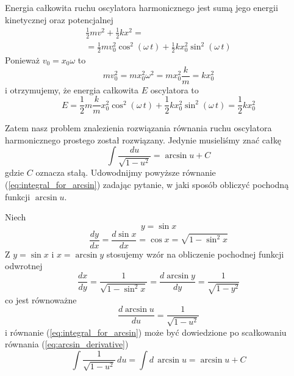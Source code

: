 \documentclass[12pt,a4paper,pl,fleqn]{article}
\begin{document}
Energia całkowita ruchu oscylatora harmonicznego jest sumą jego e\-ner\-gii kinetycznej oraz potencjalnej
\begin{eqnarray}
    \frac{1}{2} m v^{2} + \frac{1}{2} k x^{2} =                     \\ \nonumber
  = \frac{1}{2} m v_{0}^{2} \cos^{2}(\omega \, t) +
    \frac{1}{2} k x_{0}^{2} \sin^{2}(\omega \, t)
\end{eqnarray}
Ponieważ $v_{0} = x_{0} \omega$ to 
\begin{equation}
m v_{0}^{2} = m x_{0}^{2} \omega^{2} = m x_{0}^{2} \frac{k}{m} = k x_{0}^{2}
\end{equation}
i otrzymujemy, że energia całkowita $E$ oscylatora to
\begin{equation}
E = \frac{1}{2} m \frac{k}{m} x_{0}^{2} \cos^{2}(\omega \, t) + \frac{1}{2} k x_{0}^{2} \sin^{2}(\omega \, t)
=
\frac{1}{2} k x_{0}^{2}
\end{equation}

Zatem nasz problem znalezienia rozwiązania równania ruchu os\-cy\-la\-to\-ra
harmonicznego prostego został rozwiązany. Jedynie musieliśmy znać całkę
\begin{equation}
\label{eq:integral_for_arcsin}
    \int \frac{d u}{ \sqrt{ 1 - u^{2}} } = \arcsin u + C
\end{equation}
gdzie $C$ oznacza stałą. Udowodnijmy powyższe równanie (\ref{eq:integral_for_arcsin}) zadając pytanie,
w jaki sposób obliczyć pochodną funkcji $\arcsin u$\@.

Niech
\begin{equation}
                y = \sin x
\end{equation}
\begin{equation}
                \frac{d y}{d x} = \frac{d \sin x}{d x} = \cos x = \sqrt{1 - \sin^2 x}
\end{equation}
Z 
$y = \sin x$  i   $x = \arcsin y$ stosujemy wzór na obliczenie pochodnej funkcji odwrotnej
\begin{equation}
                \frac{d x}{d y} =  \frac{1}{\sqrt{1 - \sin^2 x}} = \frac{d \arcsin y}{d y}    =   \frac{1}{\sqrt{1 - y^2}}
\end{equation}
co jest równoważne
\begin{equation}
\label{eq:arcsin_derivative}
                \frac{d \arcsin u}{d u} = \frac{1}{\sqrt{1 - u^2}}
\end{equation}
i równanie (\ref{eq:integral_for_arcsin}) może być dowiedzione
po scałkowaniu równania (\ref{eq:arcsin_derivative})
\begin{equation}
\label{eq:arcsin_derivative_integration}
                \int \frac{1}{\sqrt{1 - u^2}} \, du
                =
                \int d \, \arcsin u
                =
                \arcsin u + C
\end{equation}
\end{document}
